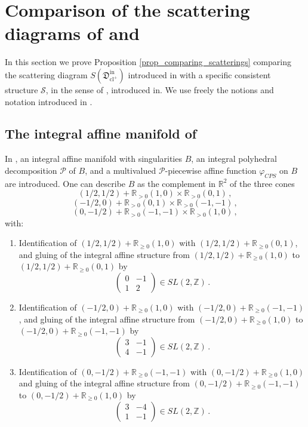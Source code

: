 \documentclass[11pt,letterpaper]{amsart}
\newcommand\R{\mathbb R}
\newcommand\Z{\mathbb Z}
\newcommand\fD{\mathfrak D}
\newcommand\cl{\operatorname{cl}}
\newcommand\iin{\mathrm{in}}
\begin{document}
\section{Comparison of the scattering diagrams of \cite{bousseau2019scattering} and \cite{cps}}
\label{section_comparison_cps_wall_structure}
In this section we prove Proposition \ref{prop_comparing_scatterings} comparing the scattering diagram $S(\fD^\iin_{\cl^+})$ introduced in \cite{bousseau2019scattering}
with a specific consistent structure 
$\mathcal{S}$, in the sense of \cite{MR2846484}, introduced in\cite[Example 2.4]{cps}. We use freely the notions and notation introduced in 
\cite{bousseau2019scattering}.

\subsection{The integral affine manifold of \cite{cps}}
\label{section_cps}
In \cite[Example 2.4]{cps}, an integral 
affine manifold with singularities $B$, an integral polyhedral decomposition 
$\mathscr{P}$ of $B$, and a multivalued 
$\mathscr{P}$-piecewise affine function 
$\varphi_{CPS}$ on $B$ are introduced.
One can describe $B$ as the complement in 
$\R^2$ of the three cones 
\[ (1/2,1/2)+\R_{> 0} (1,0) \times \R_{> 0} (0,1)\,,\]
\[(-1/2,0)+\R_{> 0} (0,1)\times \R_{> 0} (-1,-1)\,,\]
\[(0,-1/2)+\R_{> 0} (-1,-1) \times \R_{> 0} (1,0)\,,\] 
with:
\begin{enumerate}
\item Identification of $(1/2,1/2)+\R_{\geqslant 0} (1,0)$
with $(1/2,1/2)+\R_{\geqslant 0} (0,1)$, and gluing of the integral affine structure from $(1/2,1/2)+\R_{\geqslant 0} (1,0)$ 
to $(1/2,1/2)+\R_{\geqslant 0}(0,1)$ by \[ \begin{pmatrix}
 0 & -1 \\
 1 & 2
\end{pmatrix} \in SL(2,\Z)\,.\]
\item Identification of $
(-1/2,0)+\R_{\geqslant 0}(1,0)$
with $(-1/2,0)+\R_{\geqslant 0} (-1,-1)$, and gluing of the integral affine structure from $(-1/2,0)+\R_{\geqslant 0}(1,0)$
to $(-1/2,0)+\R_{\geqslant 0} (-1,-1)$ by 
\[ \begin{pmatrix}
 3 & -1 \\
 4 & -1
\end{pmatrix} \in SL(2,\Z)\,.\]
\item 
Identification of $
(0,-1/2)+\R_{\geqslant 0}(-1,-1)$
with $(0,-1/2)+\R_{\geqslant 0} (1,0)$
and gluing of the integral affine structure from $
(0,-1/2)+\R_{\geqslant 0}(-1,-1)$
to $(0,-1/2)+\R_{\geqslant 0} (1,0)$
by \[ \begin{pmatrix}
 3 & -4 \\
 1 & -1
\end{pmatrix} \in SL(2,\Z)\,.\]
\end{enumerate}
\end{document}
